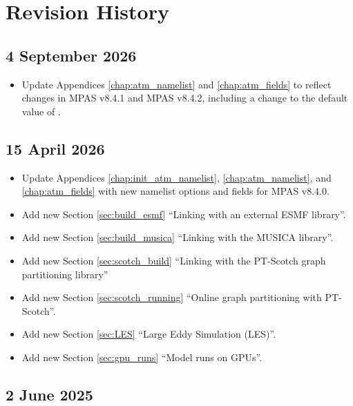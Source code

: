
\chapter{Revision History}

\section*{4 September 2026}

\begin{itemize}
\item Update Appendices \ref{chap:atm_namelist} and \ref{chap:atm_fields} to reflect changes in MPAS v8.4.1 and MPAS v8.4.2, including a change to the default value of .
\end{itemize}

\section*{15 April 2026}

\begin{itemize}
\item Update Appendices \ref{chap:init_atm_namelist}, \ref{chap:atm_namelist}, and \ref{chap:atm_fields} with new namelist options and fields for MPAS v8.4.0.
\item Add new Section \ref{sec:build_esmf} ``Linking with an external ESMF library''.
\item Add new Section \ref{sec:build_musica} ``Linking with the MUSICA library''.
\item Add new Section \ref{sec:scotch_build} ``Linking with the PT-Scotch graph partitioning library''
\item Add new Section \ref{sec:scotch_running} ``Online graph partitioning with PT-Scotch''.
\item Add new Section \ref{sec:LES} ``Large Eddy Simulation (LES)''.
\item Add new Section \ref{sec:gpu_runs} ``Model runs on GPUs''.
\end{itemize}

\section*{2 June 2025}

